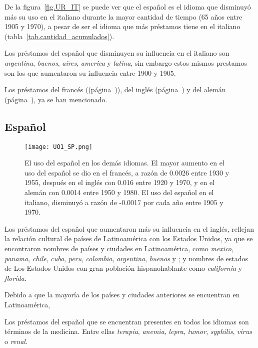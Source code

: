 De la figura~\ref{fig.UR_IT} se puede ver que el español es el idioma que disminuyó más su uso en el italiano durante la mayor cantidad de tiempo (65 años entre 1905 y 1970), a pesar de ser el idioma que más préstamos tiene en el italiano (tabla~\ref{tab.cantidad_acumulados}). 

Los préstamos del español que disminuyen su influencia en el italiano son \textit{argentina}, \textit{buenos}, \textit{aires}, \textit{america} y \textit{latina}, sin embargo estos mismos prestamos son los que aumentaron su influencia entre 1900 y 1905. 

Los préstamos del francés ((página~\pageref{FR-D})), del inglés (página~\pageref{EN-D}) y del alemán (página~\pageref{GE-D}), ya se han mencionado. 
\label{DE-IT}





\subsection{Español} %

\begin{figure}[h!] %
	\centering
	\texttt{[image: UO1\_SP.png]}
	\caption{El uso del español en los demás idiomas. El mayor aumento en el uso del español se dio en el francés, a razón de 0.0026 entre 1930 y 1955, después en el inglés con 0.016 entre 1920 y 1970,  y en el alemán con 0.0014 entre 1950 y 1980. El uso del español en el italiano, disminuyó a razón de -0.0017 por cada año entre 1905 y 1970.}
	\label{fig.UO_SP}
	
\end{figure}

Los préstamos del español que aumentaron más su influencia en el inglés,
reflejan la relación cultural de países de Latinoamérica con los Estados Unidos, ya que se encontraron nombres de países y ciudades en Latinoamérica, como \textit{mexico}, \textit{panama}, \textit{chile}, \textit{cuba}, \textit{peru}, \textit{colombia}, \textit{argentina},  \textit{buenos} y ; y nombres de estados de Los Estados Unidos con gran población hispanohablante como \textit{california} y \textit{florida}. 

Debido a que la mayoría de los países y ciudades anteriores se encuentran en Latinoamérica, 

Los préstamos del español que se encuentran presentes en todos los idiomas son términos de la medicina. Entre ellas \textit{terapia}, \textit{anemia}, \textit{lepra}, \textit{tumor}, \textit{syphilis}, \textit{virus} o \textit{renal}. 
\label{SP-D}

